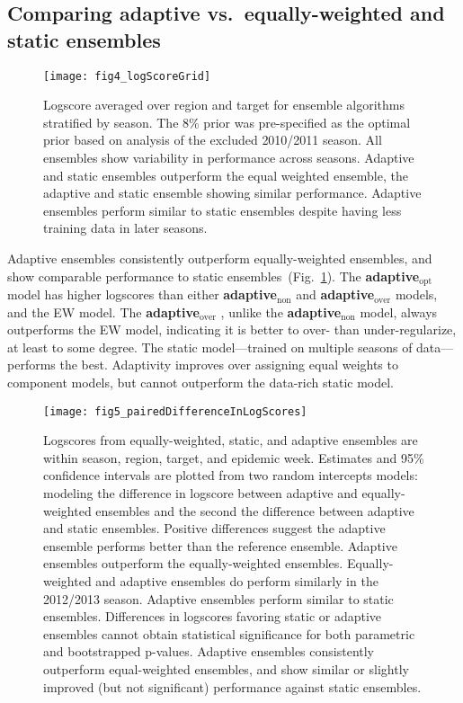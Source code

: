 \documentclass[12pt]{article}
\def\adaptNon{\textbf{adaptive$_{\text{non}}$ }}
\def\adaptOpt{\textbf{adaptive$_{\text{opt}}$ }}
\def\adaptOver{\textbf{adaptive$_{\text{over}}$ }}
\begin{document}
\subsection{Comparing adaptive vs.~equally-weighted and static ensembles}

\graphicspath{{../_6_TLGs/_G/fig4_logScoreGrid/}}
\begin{figure}[ht!]
  \centering
  \texttt{[image: fig4\_logScoreGrid]}
  \caption{
    Logscore averaged over region and target for ensemble algorithms stratified by season.
    The 8\% prior was pre-specified as the optimal prior based on analysis of the excluded 2010/2011 season.
    All ensembles show variability in performance across seasons. 
    Adaptive and static ensembles outperform the equal weighted ensemble, the adaptive and static ensemble showing similar performance.
    Adaptive ensembles perform similar to static ensembles despite having less training data in later seasons.
   \label{fig4.logScoresGrid}}
\end{figure}
Adaptive ensembles consistently outperform equally-weighted ensembles, and show comparable performance to static ensembles~(Fig.~\ref{fig4.logScoresGrid}).
The \adaptOpt model has higher logscores than either \adaptNon and \adaptOver models, and the EW model.
The \adaptOver, unlike the \adaptNon model, always outperforms the EW model, indicating it is better to over- than under-regularize, at least to some degree.
The static model---trained on multiple seasons of data---performs the best. 
Adaptivity improves over assigning equal weights to component models, but cannot outperform the data-rich static model. 

\graphicspath{{../_6_TLGs/_G/fig5_pairedDifferenceInLogScores/}}
\begin{figure}[ht!]
  \centering
  \texttt{[image: fig5\_pairedDifferenceInLogScores]}
  \caption{
    Logscores from equally-weighted, static, and adaptive ensembles are within season, region, target, and epidemic week.
    Estimates and 95\% confidence intervals are plotted from two random intercepts models: modeling the difference in logscore between adaptive and equally-weighted ensembles and the second the difference between adaptive and static ensembles.
    Positive differences suggest the adaptive ensemble performs better than the reference ensemble.
    Adaptive ensembles outperform the equally-weighted ensembles.
    Equally-weighted and adaptive ensembles do perform similarly in the 2012/2013 season.
    Adaptive ensembles perform similar to static ensembles.
    Differences in logscores favoring static or adaptive ensembles cannot obtain statistical significance for both parametric and bootstrapped p-values.
    Adaptive ensembles consistently outperform equal-weighted ensembles, and show similar or slightly improved (but not significant) performance against static ensembles.
    \label{fig5.pairedLogScoreDifferences}}
\end{figure}
\end{document}
